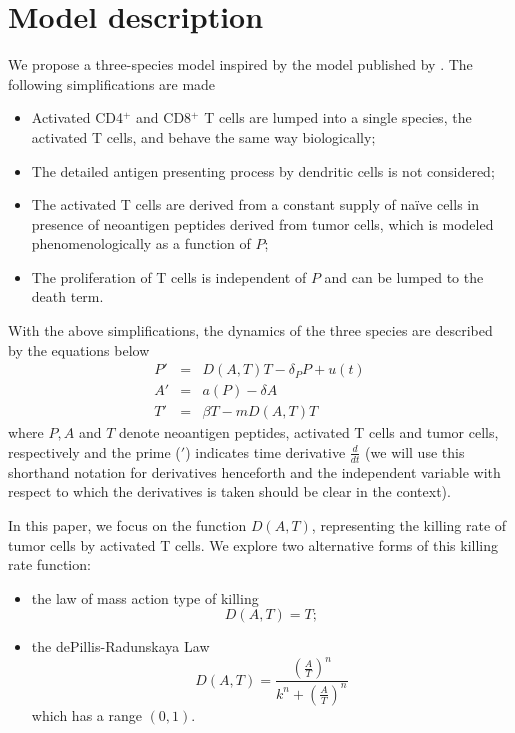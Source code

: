 \documentclass[review,authoryear]{elsarticle}
\begin{document}
\section{Model description \label{sec:A-simplified-model}}
We propose a three-species model inspired by the model published by \cite{Messan2021}. The following simplifications are made
\begin{itemize}
\item Activated CD4$^{+}$ and CD8$^{+}$ T cells are lumped into a single species, the activated T cells, and behave the same way biologically;
\item The detailed antigen presenting process by dendritic cells is not considered;
\item The activated T cells are derived from a constant supply of na\"ive cells in presence of neoantigen peptides derived from tumor cells, which is modeled phenomenologically as a function of $P$;
\item The proliferation of T cells is independent of $P$ and can be lumped to the death term.
\end{itemize} 
With the above simplifications, the dynamics of the three species are described by the equations below 
\begin{subequations}\label{eq:3sp-model}
\begin{eqnarray} 
P' & = & D(A,T)T-\delta_{P}P+u(t)\label{eq:P'}\\
A' & = & a(P)-\delta A\label{eq:A'}\\
T' & = & \beta T-mD(A,T)T\label{eq:T'}
\end{eqnarray}
\end{subequations}
where $P, A$ and $T$ denote neoantigen peptides,
activated T cells and tumor cells, respectively and the prime ($'$) indicates time derivative $\frac{d}{dt}$ (we will
use this shorthand notation for derivatives henceforth and the independent variable with respect to which the derivatives is taken should be clear in the context). 

In this paper, we focus on the function $D(A,T)$, representing the killing rate of tumor cells by activated T cells. We explore two alternative forms of this killing rate function:
\begin{itemize}
\item the law of mass action type of killing
\begin{equation} 
   D(A,T)=T; \label{eq:mass-action-killing} 
\end{equation}
\item the dePillis-Radunskaya Law 
\begin{equation}
D(A,T)=\frac{(\frac{A}{T})^{n}}{k^{n}+(\frac{A}{T})^{n}} \label{eq:PR law-1} 
\end{equation}
which has a range $(0,1)$. 
\end{itemize}
\end{document}
